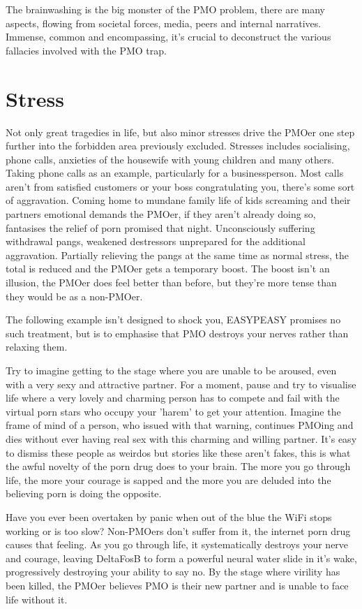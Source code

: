 \documentclass[easypeasy.tex]{subfiles}
\begin{document}
The brainwashing is the big monster of the PMO problem, there are many aspects, flowing from societal forces, media, peers and internal narratives. Immense, common and encompassing, it's crucial to deconstruct the various fallacies involved with the PMO trap.

\section{Stress}

Not only great tragedies in life, but also minor stresses drive the PMOer one step further into the forbidden area previously excluded. Stresses includes socialising, phone calls, anxieties of the housewife with young children and many others. Taking phone calls as an example, particularly for a businessperson. Most calls aren't from satisfied customers or your boss congratulating you, there's some sort of aggravation. Coming home to mundane family life of kids screaming and their partners emotional demands the PMOer, if they aren't already doing so, fantasises the relief of porn promised that night. Unconsciously suffering withdrawal pangs, weakened destressors unprepared for the additional aggravation. Partially relieving the pangs at the same time as normal stress, the total is reduced and the PMOer gets a temporary boost. The boost isn't an illusion, the PMOer does feel better than before, but they're more tense than they would be as a non-PMOer.

The following example isn't designed to shock you, EASYPEASY promises no such treatment, but is to emphasise that PMO destroys your nerves rather than relaxing them.

Try to imagine getting to the stage where you are unable to be aroused, even with a very sexy and attractive partner. For a moment, pause and try to visualise life where a very lovely and charming person has to compete and fail with the virtual porn stars who occupy your 'harem' to get your attention. Imagine the frame of mind of a person, who issued with that warning, continues PMOing and dies without ever having real sex with this charming and willing partner. It's easy to dismiss these people as weirdos but stories like these aren't fakes, this is what the awful novelty of the porn drug does to your brain. The more you go through life, the more your courage is sapped and the more you are deluded into the believing porn is doing the opposite.

Have you ever been overtaken by panic when out of the blue the WiFi stops working or is too slow? Non-PMOers don't suffer from it, the internet porn drug causes that feeling. As you go through life, it systematically destroys your nerve and courage, leaving DeltaFosB to form a powerful neural water slide in it's wake, progressively destroying your ability to say no. By the stage where virility has been killed, the PMOer believes PMO is their new partner and is unable to face life without it.
\end{document}
